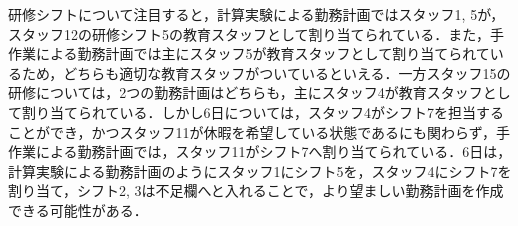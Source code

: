 \documentclass[twocolumn]{jsarticle}
\begin{document}
研修シフトについて注目すると，計算実験による勤務計画ではスタッフ1, 5が，スタッフ12の研修シフト5の教育スタッフとして割り当てられている．また，手作業による勤務計画では主にスタッフ5が教育スタッフとして割り当てられているため，どちらも適切な教育スタッフがついているといえる．一方スタッフ15の研修については，2つの勤務計画はどちらも，主にスタッフ4が教育スタッフとして割り当てられている．しかし6日については，スタッフ4がシフト7を担当することができ，かつスタッフ11が休暇を希望している状態であるにも関わらず，手作業による勤務計画では，スタッフ11がシフト7へ割り当てられている．6日は，計算実験による勤務計画のようにスタッフ1にシフト5を，スタッフ4にシフト7を割り当て，シフト2, 3は不足欄へと入れることで，より望ましい勤務計画を作成できる可能性がある．

\vspace{\baselineskip}
\begin{table}[htb]
 \begin{center}
  \caption{勤務回数の比較 (回/月) }
  \label{tab:compare}
 \end{center}
\end{table}
\begin{table}[htb]
\begin{center}
\caption{契約勤務回数との差の平均}
\label{tab:mean_stdev}
\end{center}
\end{table}
\end{document}
